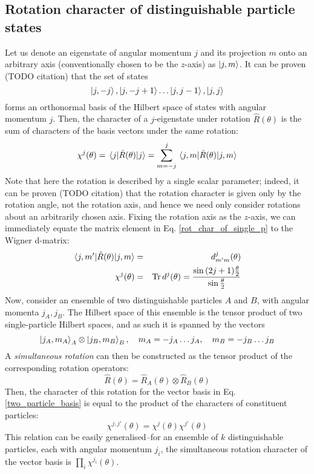 \documentclass[12pt]{article}
\begin{document}
	\subsection{Rotation character of distinguishable particle states}
	Let us denote an eigenstate of angular momentum $j$ and its projection $m$ onto an arbitrary axis (conventionally chosen to be the $z$-axis) as $\ket{j, m}$. It can be proven (TODO citation) that the set of states
	$$\ket{j, -j}, \ket{j, -j+1} \dots \ket{j, j-1}, \ket{j, j}$$
	forms an orthonormal basis of the Hilbert space of states with angular momentum $j$. Then, the character of a $j$-eigenstate under rotation $\hat{R}(\theta)$ is the sum of characters of the basis vectors under the same rotation:
	\begin{equation} \label{rot_char_of_single_p}
	\chi^j(\theta)=\mel{j}{\hat{R}(\theta)}{j}=\sum_{m=-j}^j \mel{j, m}{\hat{R}(\theta)}{j, m}
	\end{equation}
	Note that here the rotation is described by a single scalar parameter; indeed, it can be proven (TODO citation) that the rotation character is given only by the rotation angle, not the rotation axis, and hence we need only consider rotations about an arbitrarily chosen axis. Fixing the rotation axis as the $z$-axis, we can immediately equate the matrix element in Eq. \ref{rot_char_of_single_p} to the Wigner d-matrix:
	\begin{eqnarray}
	\mel{j, m'}{\hat{R}(\theta)}{j, m} &=& d^j_{m'm}(\theta)\\
	\chi^j(\theta)&=&\Tr d^j(\theta) = \frac{\sin{(2j+1)\frac{\theta}{2}}}{\sin{\frac{\theta}{2}}} \label{single_particle_character}
	\end{eqnarray}
	Now, consider an ensemble of two distinguishable particles $A$ and $B$, with angular momenta $j_A, j_B$. The Hilbert space of this ensemble is the tensor product of two single-particle Hilbert spaces, and as such it is spanned by the vectors
	\begin{equation} \label{two_particle_basis}
	\ket{j_A, m_A}_A\otimes\ket{j_B, m_B}_B, \quad m_A = -j_A \dots j_A, \quad m_B = -j_B \dots j_B
	\end{equation}
	A \textit{simultaneous rotation} can then be constructed as the tensor product of the corresponding rotation operators:
	$$\hat{R}(\theta)=\hat{R}_A(\theta)\otimes\hat{R}_B(\theta)$$
	Then, the character of this rotation for the vector basis in Eq. \ref{two_particle_basis} is equal to the product of the characters of constituent particles:
	\begin{equation}
	\chi^{j,j'}(\theta)=\chi^j(\theta)\chi^{j'}(\theta)
	\end{equation}
	This relation can be easily generalised--for an ensemble of $k$ distinguishable particles, each with angular momentum $j_i$, the simultaneous rotation character of the vector basis is $\prod_{i}\chi^{j_i}(\theta)$.
	
\end{document}
